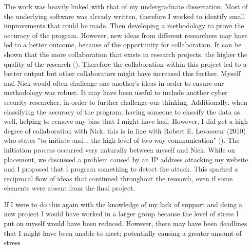 The work was heavily linked with that of my undergraduate dissertation. Most of the underlying software was already written, therefore I worked to identify small improvements that could be made. Then developing a methodology to prove the accuracy of the program. However, new ideas from different researchers may have led to a better outcome, because of the opportunity for collaboration. It can be shown that the more collaboration that exists in research projects, the higher the quality of the research (\cite{figg2006scientific}). Therefore the collaboration within this project led to a better output but other collaborators might have increased this further. Myself and Nick would often challenge one another's ideas in order to ensure our methodology was robust. It may have been useful to include another cyber security researcher, in order to further challenge our thinking. Additionally, when classifying the accuracy of the program; having someone to classify the data as well, helping to remove any bias that I might have had. However, I did get a high degree of collaboration with Nick; this is in line with Robert E. Levasseur (2010) who states "to initiate and... the high level of two-way communication" (\cite{levasseur2010people}). The initiation process occurred very naturally between myself and Nick. While on placement, we discussed a problem caused by an IP address attacking my website and I proposed that I program something to detect the attack. This sparked a reciprocal flow of ideas that continued throughout the research, even if some elements were absent from the final project. 



If I were to do this again with the knowledge of my lack of support and doing a new project I would have worked in a larger group because the level of stress I put on myself would have been reduced. However, there may have been deadlines that I might have been unable to meet; potentially causing a greater amount of stress



